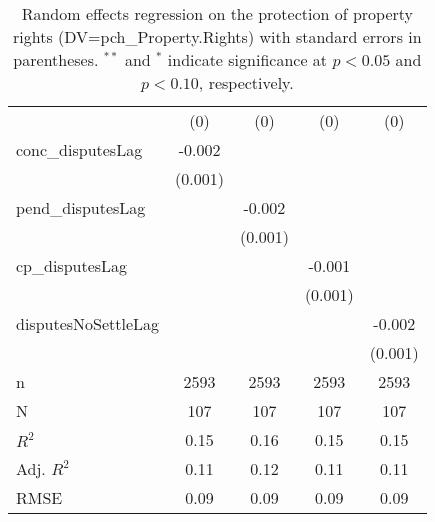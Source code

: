 \begin{table}[ht]
\begin{tabular}{lcccc}
   & (0) & (0) & (0) & (0) \\ 
  conc\_disputesLag & -0.002 &  &  &  \\ 
   & (0.001) &  &  &  \\ 
  pend\_disputesLag &  & -0.002 &  &  \\ 
   &  & (0.001) &  &  \\ 
  cp\_disputesLag &  &  & -0.001 &  \\ 
   &  &  & (0.001) &  \\ 
  disputesNoSettleLag &  &  &  & -0.002 \\ 
   &  &  &  & (0.001) \\ 
   \hline
n & 2593 & 2593 & 2593 & 2593 \\ 
  N & 107 & 107 & 107 & 107 \\ 
  $R^{2}$ & 0.15 & 0.16 & 0.15 & 0.15 \\ 
  Adj. $R^{2}$ & 0.11 & 0.12 & 0.11 & 0.11 \\ 
  RMSE & 0.09 & 0.09 & 0.09 & 0.09 \\ 
   \hline
\hline
\end{tabular}
\caption{Random effects regression on the protection of property rights (DV=pch\_Property.Rights) with standard errors in parentheses. $^{**}$ and $^{*}$ indicate significance at $p< 0.05 $ and $p< 0.10 $, respectively.} 
\end{table}
